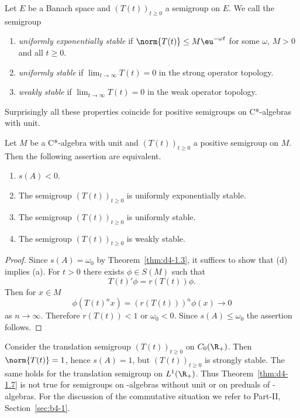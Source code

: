 \begin{definition}\label{def:d4-1.6}
Let $E$ be a Banach space and $(T(t))_{t \geq 0}$ a semigroup on $E$.
We call the semigroup
\begin{enumerate}[\upshape (i)]
\item 
\emph{uniformly exponentially stable} if\/ $\norm{T(t)} \leq M\eu^{-\omega t}$ for some $\omega$, $M > 0$ and all $t \geq 0$.

\item 
\emph{uniformly stable} if\/ $\lim_{t \to \infty} T(t) = 0$ in the strong operator topology.

\item 
\emph{weakly stable} if\/ $\lim_{t \to \infty} T(t) = 0$ in the weak operator topology.
\end{enumerate}
\end{definition}
Surprisingly all these properties coincide for positive semigroups on C*-algebras with unit.
\begin{theorem}\label{thm:d4-1.7}
Let $M$ be a C*-algebra with unit and $(T(t))_{t \geq 0}$ a positive semigroup on $M$.
Then the following assertion are equivalent.
\begin{enumerate}[\upshape (a)]
\item 
$s(A) < 0$.

\item 
The semigroup $(T(t))_{t \geq 0}$ is uniformly exponentially stable.

\item 
The semigroup $(T(t))_{t \geq 0}$ is uniformly stable.

\item 
The semigroup $(T(t))_{t \geq 0}$ is weakly stable.

\end{enumerate}
\end{theorem}
\begin{proof}
Since $s(A) = \omega_{0}$ by Theorem~\ref{thm:d4-1.3}, it suffices to show that (d) implies (a).
For $t > 0$ there exists $\phi \in S(M)$ such that
\[
    T(t)'\phi = r(T(t))\phi .
\]
Then for $x \in M$
\[
    \phi(T(t)^{n}x) = (r(T(t)))^{n} \phi(x) \to 0
\]
as $n \to \infty$.
Therefore $r(T(t)) < 1$ or $\omega_{0} < 0$.
Since $s(A) \leq \omega_{0}$ the assertion follows.
\end{proof}
\begin{remark}\label{rem:d4-1.8}
Consider the translation semigroup $(T(t))_{t \geq 0}$ on $C_{0}(\R_{+})$. 
Then {$\norm{T(t)} = 1$}, hence $s(A) = 1$, but $(T(t))_{t \geq 0}$ is strongly stable.
The same holds for the translation semigroup on $L^1(\R_{+})$.
Thus Theorem~\ref{thm:d4-1.7} is not true for semigroups on \CA-algebras without unit or on preduals of \WA-algebras.
For the discussion of the commutative situation we refer to Part-II, Section~\ref{sec:b4-1}.
\end{remark}
